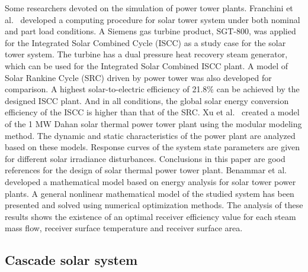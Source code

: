 Some researchers devoted on the simulation of power tower plants.
Franchini et al.~\cite{Franchini2013} developed a computing procedure for solar tower system under both nominal and part load conditions. A Siemens gas turbine product, SGT-800, was applied for the Integrated Solar Combined Cycle (ISCC) as a study case for the solar tower system. The turbine has a dual pressure heat recovery steam generator, which can be used for the Integrated Solar Combined ISCC plant. A model of Solar Rankine Cycle (SRC) driven by power tower was also developed for comparison. A highest solar-to-electric efficiency of 21.8\% can be achieved by the designed ISCC plant. And in all conditions, the global solar energy conversion efficiency of the ISCC is higher than that of the SRC.
Xu et al.~\cite{Xu2011a,Xu2012} created a model of the 1 MW Dahan solar thermal power tower plant using the modular modeling method. The dynamic and static characteristics of the power plant are analyzed based on these models. Response curves of the system state parameters are given for different solar irradiance disturbances. Conclusions in this paper are good references for the design of solar thermal power tower plant.
Benammar et al.~\cite{Benammar2014} developed a mathematical model based on energy analysis for solar tower power plants. A general nonlinear mathematical model of the studied system  has been presented and solved using numerical optimization methods. The analysis of these results shows the existence of an optimal receiver efficiency value for each steam mass flow, receiver surface temperature and receiver surface area.

\subsection{Cascade solar system}
\label{sec:cs}

